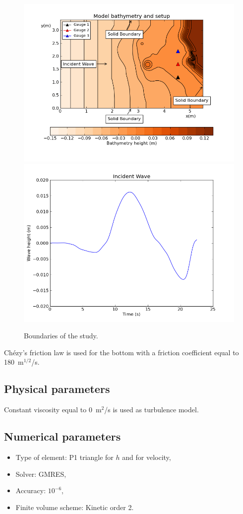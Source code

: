 \begin{figure}[H]
\centering
\includegraphics[width=.6\textwidth]{img/boundaries.png}
\includegraphics[width=.6\textwidth]{img/wave.png}
\caption{Boundaries of the study.}
\label{fig:monai:boundaries}
\end{figure}

Chézy's friction law is used for the bottom with a friction coefficient equal
to 180~m$^{1/2}$/s.

\subsection{Physical parameters}

Constant viscosity equal to 0~m$^2$/s is used as turbulence model.

\subsection{Numerical parameters}
\begin{itemize}
\item Type of element: P1 triangle for $h$ and for velocity,
\item Solver: GMRES,
\item Accuracy: $10^{-6}$,
\item Finite volume scheme: Kinetic order 2.
\end{itemize}

